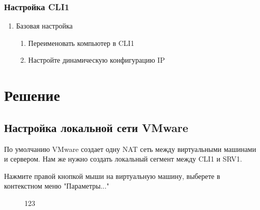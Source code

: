 \documentclass[a4paper, 12pt]{report}
\begin{document}
	\subsubsection{Настройка CLI1}

	\begin{enumerate}
		\item Базовая настройка
		\begin{enumerate}
			\item Переименовать компьютер в CLI1
			\item Настройте динамическую конфигурацию IP
		\end{enumerate}
	\end{enumerate}

	\clearpage
	
	\section{Решение}
	
	\subsection{Настройка локальной сети VMware}
	
	По умолчанию VMware создает одну NAT сеть между виртуальными машинами и сервером. Нам же нужно создать локальный сегмент между CLI1 и SRV1.
	
	Нажмите правой кнопкой мыши на виртуальную машину, выберете в контекстном меню "Параметры..."
	
	\begin{figure}[h]
		\caption{123}
		\label{fig:image}
	\end{figure}
\end{document}
